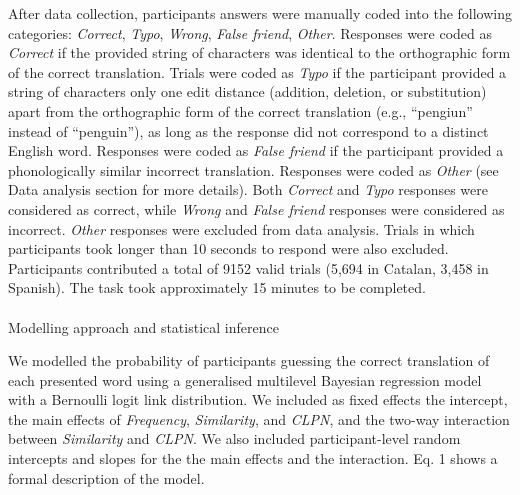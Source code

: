 \documentclass[
]{article}
\makeatletter
\let\oldparagraph\paragraph
\renewcommand{\paragraph}{
    \@ifstar
      \xxxParagraphStar
      \xxxParagraphNoStar
  }
\newcommand{\xxxParagraphStar}[1]{\oldparagraph*{#1}\mbox{}}
\newcommand{\xxxParagraphNoStar}[1]{\oldparagraph{#1}\mbox{}}
\makeatother
\begin{document}
After data collection, participants answers were manually coded into the
following categories: \emph{Correct}, \emph{Typo}, \emph{Wrong},
\emph{False friend}, \emph{Other}. Responses were coded as
\emph{Correct} if the provided string of characters was identical to the
orthographic form of the correct translation. Trials were coded as
\emph{Typo} if the participant provided a string of characters only one
edit distance (addition, deletion, or substitution) apart from the
orthographic form of the correct translation (e.g., ``pengiun'' instead
of ``penguin''), as long as the response did not correspond to a
distinct English word. Responses were coded as \emph{False friend} if
the participant provided a phonologically similar incorrect translation.
Responses were coded as \emph{Other} (see Data analysis section for more
details). Both \emph{Correct} and \emph{Typo} responses were considered
as correct, while \emph{Wrong} and \emph{False friend} responses were
considered as incorrect. \emph{Other} responses were excluded from data
analysis. Trials in which participants took longer than 10 seconds to
respond were also excluded. Participants contributed a total of 9152
valid trials (5,694 in Catalan, 3,458 in Spanish). The task took
approximately 15 minutes to be completed.

\paragraph{Modelling approach and statistical
inference}\label{modelling-approach-and-statistical-inference}

We modelled the probability of participants guessing the correct
translation of each presented word using a generalised multilevel
Bayesian regression model with a Bernoulli logit link distribution. We
included as fixed effects the intercept, the main effects of
\emph{Frequency}, \emph{Similarity}, and \emph{CLPN}, and the two-way
interaction between \emph{Similarity} and \emph{CLPN}. We also included
participant-level random intercepts and slopes for the the main effects
and the interaction. Eq. 1 shows a formal description of the model.
\end{document}
